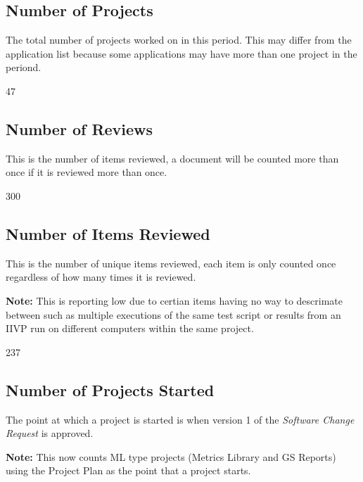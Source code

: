 \documentclass{article}
\begin{document}
\subsection{Number of Projects}
The total number of  projects worked on in this period. This may differ from the
application list because some applications may have more than one project in
the periond.

\begin{Schunk}
\begin{Soutput}
[1] 47
\end{Soutput}
\end{Schunk}

\subsection{Number of Reviews}
This is the number of items reviewed, a document will be counted more than once
if it is reviewed more than once.

\begin{Schunk}
\begin{Soutput}
[1] 300
\end{Soutput}
\end{Schunk}

\subsection{Number of Items Reviewed}
This is the number of unique items reviewed, each item is only counted once
regardless of how many times it is reviewed.

\textbf{Note:} This is reporting low due to certian items having no way to
descrimate between such as multiple executions of the same test script or
results from an IIVP run on different computers within the same project.

\begin{Schunk}
\begin{Soutput}
[1] 237
\end{Soutput}
\end{Schunk}

\subsection{Number of Projects Started}
The point at which a project is started is when version 1 of the \textit{Software
Change Request} is approved.

\textbf{Note:} This now counts ML type projects (Metrics Library and GS Reports)
using the Project Plan as the point that a project starts.
\end{document}
